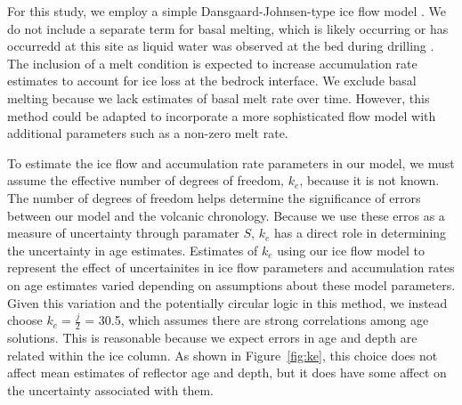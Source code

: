 For this study, we employ a simple Dansgaard-Johnsen-type ice flow model \citep{schwander2001}. We do not include a separate term for basal melting, which is likely occurring or has occurredd at this site as liquid water was observed at the bed during drilling \citep{gow1968}. The inclusion of a melt condition is expected to increase accumulation rate estimates to account for ice loss at the bedrock interface. We exclude basal melting because we lack estimates of basal melt rate over time. However, this method could be adapted to incorporate a more sophisticated flow model with additional parameters such as a non-zero melt rate. 



To estimate the ice flow and accumulation rate parameters in our model, we must assume the effective number of degrees of freedom, $k_e$,  because it is not known. The number of degrees of freedom helps determine the significance of errors between our model and the volcanic chronology. Because we use these erros as a measure of uncertainty through paramater $S$, $k_e$ has a direct role in determining the uncertainty in age estimates. Estimates of $k_e$ using our ice flow model to represent the effect of uncertainites in ice flow parameters and accumulation rates on age estimates varied depending on assumptions about these model parameters. Given this variation and the potentially circular logic in this method, we instead choose $k_e = \frac{j}{2}$ = 30.5, which assumes there are strong correlations among age solutions. This is reasonable because we expect errors in age and depth are related within the ice column. 
As shown in Figure~\ref{fig:ke}, this choice does not affect mean estimates of reflector age and depth, but it does have some affect on the uncertainty associated with them. 


